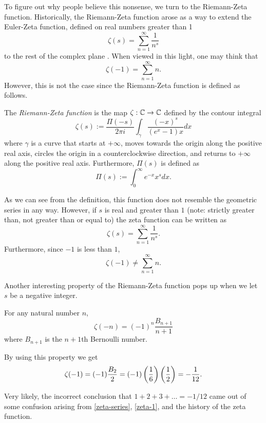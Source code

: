 \documentclass[]{simple}
\begin{document}
To figure out why people believe this nonsense, we turn to the Riemann-Zeta function.
Historically, the Riemann-Zeta function arose as a way to extend the Euler-Zeta function, defined on real numbers greater than 1
\[
	\zeta(s)=\sum_{n=1}^\infty \frac{1}{n^s}
\]
to the rest of the complex plane \cite{edwards}.
When viewed in this light, one may think that
\[
	\zeta(-1)=\sum_{n=1}^\infty n.
\]
However, this is not the case since the Riemann-Zeta function is defined as follows.
\begin{definition}
	The \textit{Riemann-Zeta function} is the map $\zeta:\mathbb{C}\rightarrow\mathbb{C}$ defined by the contour integral
	\[
		\zeta(s):=\frac{\Pi(-s)}{2\pi i}\int_\gamma\frac{(-x)^s}{(e^x-1)x}dx
	\]
	where $\gamma$ is a curve that starts at $+\infty$, moves towards the origin along the positive real axis, circles the origin in a counterclockwise direction, and returns to $+\infty$ along the positive real axis.
	Furthermore, $\Pi(s)$ is defined as
	\[
		\Pi(s):=\int_0^\infty e^{-x}x^s dx.
	\]
\end{definition}

As we can see from the definition, this function does not resemble the geometric series in any way.
However, if $s$ is real and greater than $1$ (note: strictly greater than, not greater than or equal to) the zeta function can be written as
\begin{equation}\label{zeta-series}
	\zeta(s)=\sum_{n=1}^\infty\frac{1}{n^s}.
\end{equation}
Furthermore, since $-1$ is less than $1$,
\[
	\zeta(-1)\neq\sum_{n=1}^\infty n.
\]

Another interesting property of the Riemann-Zeta function pops up when we let $s$ be a negative integer.
\begin{proposition}
	For any natural number $n$,
	\[
		\zeta(-n)=(-1)^n\frac{B_{n+1}}{n+1}
	\]
	where $B_{n+1}$ is the $n+1$th Bernoulli number.
\end{proposition}
By using this property we get
\begin{equation}\label{zeta-1}
	\zeta(-1)=(-1)\frac{B_2}{2}=(-1)\left( \frac{1}{6} \right)\left( \frac{1}{2} \right)=-\frac{1}{12}.
\end{equation}

Very likely, the incorrect conclusion that $1+2+3+\ldots=-1/12$ came out of some confusion arising from \autoref{zeta-series}, \autoref{zeta-1}, and the history of the zeta function.

\printbibliography
\end{document}
